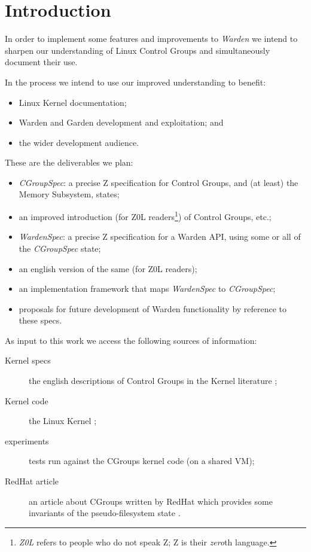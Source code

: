 \documentclass[a4paper,twoside,12pt]{article}
\begin{document}
\clearpage
{}

\section{Introduction}

In order to implement some features and improvements to \emph{Warden} we intend to sharpen our understanding of Linux Control Groups and simultaneously document their use.

In the process we intend to use our improved understanding to benefit:
\begin{itemize}
\item Linux Kernel documentation;
\item Warden \cite{warden} and Garden \cite{garden} development and exploitation; and
\item the wider development audience.
\end{itemize}
These are the deliverables we plan:

\begin{itemize}
\item \emph{CGroupSpec}: a precise Z specification for Control Groups, and (at least) the Memory Subsystem, states;
\item an improved introduction (for Z0L readers\footnote{\emph{Z0L} refers to people who do not speak Z; Z is their \emph{zero}th language.}) of Control Groups, etc.;
\item \emph{WardenSpec}: a precise Z specification for a Warden API, using some or all of the \emph{CGroupSpec} state;
\item an english version of the same (for Z0L readers);
\item an implementation framework that maps \emph{WardenSpec} to \emph{CGroupSpec};
\item proposals for future development of Warden functionality by reference to these specs.
\end{itemize}
As input to this work we access the following sources of information:

\begin{description}
\item[Kernel specs] the english descriptions of Control Groups in the Kernel literature \cite{linuxspecs};
\item[Kernel code] the Linux Kernel \cite{linuxkernel};
\item[experiments] tests run against the CGroups kernel code (on a shared VM);
\item[RedHat article] an article about CGroups written by RedHat which provides some invariants of the pseudo-filesystem state \cite{rharticle}.
\end{description}
\end{document}
